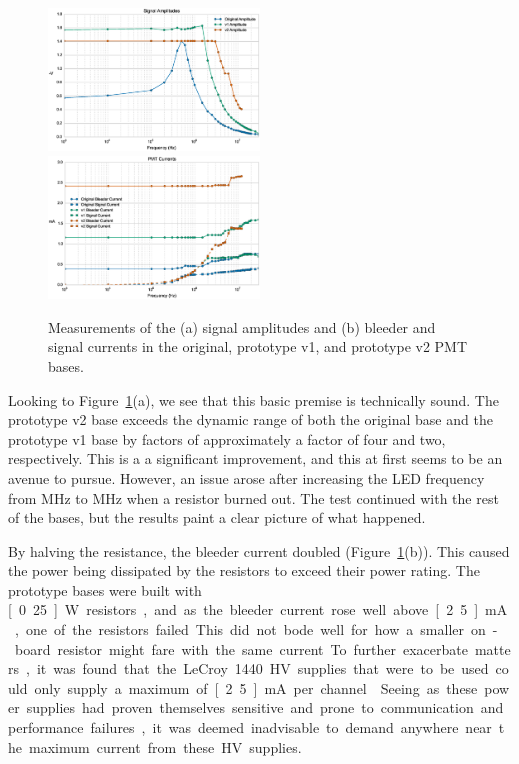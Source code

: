 \begin{figure}[h]
	\centerline{
		\mbox{\includegraphics[width=0.5\textwidth]{figures/Test_v2_Amp.eps} \includegraphics[width=0.5\textwidth]{figures/Test_v2_Current.eps}}}
	\caption{Measurements of the (a) signal amplitudes and (b) bleeder and signal currents in the original, prototype v1, and prototype v2 PMT bases.}
	\label{fig:test-v2}
\end{figure}

Looking to Figure~\ref{fig:test-v2}(a), we see that this basic premise is technically sound. The prototype v2 base exceeds the dynamic range of both the original base and the prototype v1 base by factors of approximately a factor of four and two, respectively. This is a a significant improvement, and this at first seems to be an avenue to pursue. However, an issue arose after increasing the LED frequency from \unit[13]{MHz} to \unit[14]{MHz} when a resistor burned out. The test continued with the rest of the bases, but the results paint a clear picture of what happened. 

By halving the resistance, the bleeder current doubled (Figure~\ref{fig:test-v2}(b)). This caused the power being dissipated by the resistors to exceed their power rating. The prototype bases were built with \unit[0.25]{W} resistors, and as the bleeder current rose well above \unit[2.5]{mA}, one of the resistors failed. This did not bode well for how a smaller on-board resistor might fare with the same current.

To further exacerbate matters, it was found that the LeCroy 1440 HV supplies that were to be used could only supply a maximum of \unit[2.5]{mA} per channel~\cite{lecroy:1440}. Seeing as these power supplies had proven themselves sensitive and prone to communication and performance failures, it was deemed inadvisable to demand anywhere near the maximum current from these HV supplies.

